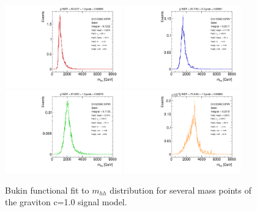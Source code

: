 \begin{figure}[!h]
\begin{center}
\includegraphics*[width=0.45\textwidth]{./figures/boosted/SigInterpolation/GravitonFit_Ghh1000C10RW_Bukin}
\includegraphics*[width=0.45\textwidth]{./figures/boosted/SigInterpolation/GravitonFit_Ghh1500C10RW_Bukin}\\
\includegraphics*[width=0.45\textwidth]{./figures/boosted/SigInterpolation/GravitonFit_Ghh2000C10RW_Bukin}
\includegraphics*[width=0.45\textwidth]{./figures/boosted/SigInterpolation/GravitonFit_Ghh3000C10RW_Bukin}
\caption{Bukin functional fit to $m_{hh}$ distribution for several mass points of the graviton c=1.0 signal model.}
\label{fig:boosted_siginter_bukinfit_c10RW}
\end{center}
\end{figure}
\FloatBarrier


